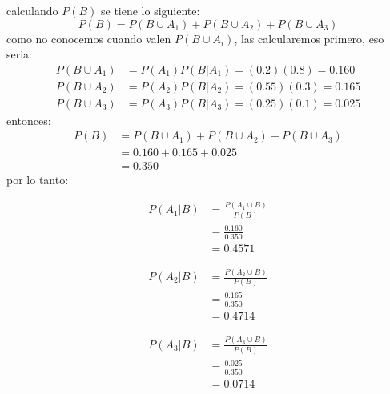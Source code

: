 \begin{ejemplo}
    calculando $P(B)$ se tiene lo siguiente:
    \begin{equation*}
        P(B) = P(B\cup A_1)+P(B\cup A_2)+P(B\cup A_3)
    \end{equation*}
    como no conocemos cuando valen $P(B\cup A_i)$, las calcularemos primero, eso seria:
    \begin{align*}
        P(B\cup A_1) & = P(A_1)P(B|A_1) = (0.2)(0.8)=0.160  \\
        P(B\cup A_2) & = P(A_2)P(B|A_2) = (0.55)(0.3)=0.165 \\
        P(B\cup A_3) & = P(A_3)P(B|A_3) = (0.25)(0.1)=0.025
    \end{align*}
    entonces:
    \begin{align*}
        P(B) & = P(B\cup A_1)+P(B\cup A_2)+P(B\cup A_3) \\
             & = 0.160+0.165+0.025                      \\
             & = 0.350
    \end{align*}
    por lo tanto:\\
    \begin{minipage}{0.3\linewidth}
        \begin{align*}
            P(A_1|B) & =\frac{P(A_1 \cup B)}{P(B)} \\
                     & = \frac{0.160}{0.350}       \\
                     & = 0.4571
        \end{align*}
    \end{minipage}
    \begin{minipage}{0.3\linewidth}
        \begin{align*}
            P(A_2|B) & =\frac{P(A_2 \cup B)}{P(B)} \\
                     & = \frac{0.165}{0.350}       \\
                     & = 0.4714
        \end{align*}
    \end{minipage}
    \begin{minipage}{0.3\linewidth}
        \begin{align*}
            P(A_3|B) & =\frac{P(A_3 \cup B)}{P(B)} \\
                     & = \frac{0.025}{0.350}       \\
                     & = 0.0714
        \end{align*}
    \end{minipage}
\end{ejemplo}